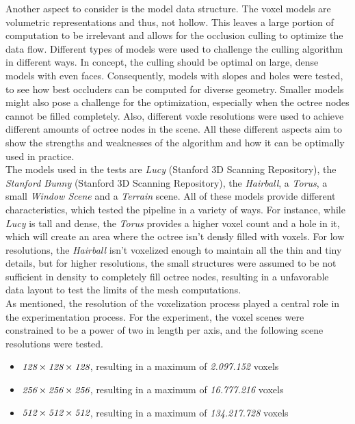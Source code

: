 Another aspect to consider is the model data structure. The voxel models are volumetric representations and thus, 
not hollow. This leaves a large portion of computation to be irrelevant and allows for the occlusion culling to 
optimize the data flow. Different types of models were used to challenge the culling algorithm in different ways. 
In concept, the culling should be optimal on large, dense models with even faces. Consequently, models with 
slopes and holes were tested, to see how best occluders can be computed for diverse geometry. Smaller models might 
also pose a challenge for the optimization, especially when the octree nodes cannot be filled completely. Also, 
different voxle resolutions were used to achieve different amounts of octree nodes in the scene. All these different 
aspects aim to show the strengths and weaknesses of the algorithm and how it can be optimally used in practice. \\

\noindent
The models used in the tests are \emph{Lucy} (Stanford 3D Scanning Repository), the \emph{Stanford Bunny} 
(Stanford 3D Scanning Repository), the \emph{Hairball}, a \emph{Torus}, a small \emph{Window Scene} and a 
\emph{Terrain} scene. All of these models provide different characteristics, which tested the pipeline in 
a variety of ways. For instance, while \emph{Lucy} is tall and dense, the \emph{Torus} provides a higher 
voxel count and a hole in it, which will create an area where the octree isn't densly filled with voxels. 
For low resolutions, the \emph{Hairball} isn't voxelized enough to maintain all the thin and tiny details, 
but for higher resolutions, the small structures were assumed to be not sufficient in density to completely 
fill octree nodes, resulting in a unfavorable data layout to test the limits of the mesh computations. \\

\noindent
As mentioned, the resolution of the voxelization process played a central role in the experimentation process.
For the experiment, the voxel scenes were constrained to be a power of two in length per axis, and the following
scene resolutions were tested.

\begin{itemize}
    \item \begin{math} \emph{128} \times \emph{128} \times \emph{128}\end{math}, resulting in a maximum of \emph{2.097.152} voxels
    \item \begin{math} \emph{256} \times \emph{256} \times \emph{256}\end{math}, resulting in a maximum of \emph{16.777.216} voxels
    \item \begin{math} \emph{512} \times \emph{512} \times \emph{512}\end{math}, resulting in a maximum of \emph{134.217.728} voxels
\end{itemize}

